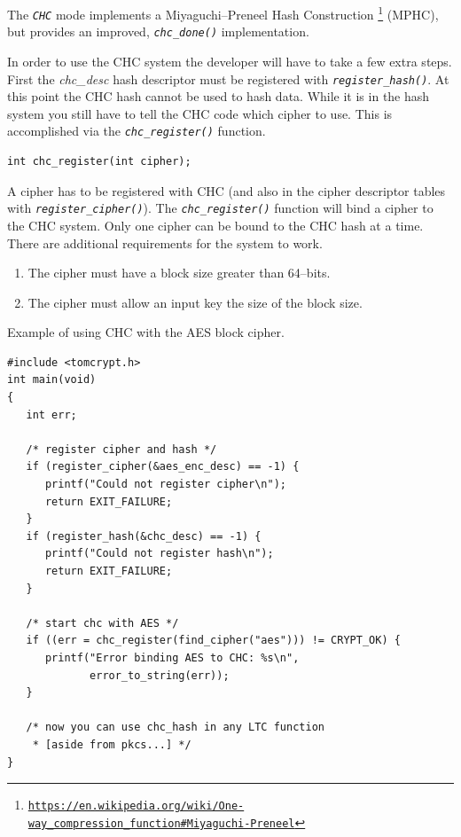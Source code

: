 \documentclass[synpaper]{book}
\newcommand{\code}[1]{\texttt{\textit{#1}}}
\begin{document}
The \code{CHC} mode implements a Miyaguchi–Preneel Hash Construction
\footnote{\href{https://en.wikipedia.org/wiki/One-way_compression_function\#Miyaguchi–Preneel}{\nolinkurl{https://en.wikipedia.org/wiki/One-way_compression_function\#Miyaguchi-Preneel}}}
(MPHC), but provides an improved, \code{chc\_done()} implementation.


In order to use the CHC system the developer will have to take a few extra steps.  First the \textit{chc\_desc} hash
descriptor must be registered with \code{register\_hash()}.  At this point the CHC hash cannot be used to hash
data.  While it is in the hash system you still have to tell the CHC code which cipher to use.  This is accomplished
via the \code{chc\_register()} function.

\begin{verbatim}
int chc_register(int cipher);
\end{verbatim}

A cipher has to be registered with CHC (and also in the cipher descriptor tables with
\code{register\_cipher()}).  The \code{chc\_register()} function will bind a cipher to the CHC system.  Only one cipher can
be bound to the CHC hash at a time.  There are additional requirements for the system to work.

\begin{enumerate}
   \item The cipher must have a block size greater than 64--bits.
   \item The cipher must allow an input key the size of the block size.
\end{enumerate}

Example of using CHC with the AES block cipher.

\begin{verbatim}
#include <tomcrypt.h>
int main(void)
{
   int err;

   /* register cipher and hash */
   if (register_cipher(&aes_enc_desc) == -1) {
      printf("Could not register cipher\n");
      return EXIT_FAILURE;
   }
   if (register_hash(&chc_desc) == -1) {
      printf("Could not register hash\n");
      return EXIT_FAILURE;
   }

   /* start chc with AES */
   if ((err = chc_register(find_cipher("aes"))) != CRYPT_OK) {
      printf("Error binding AES to CHC: %s\n",
             error_to_string(err));
   }

   /* now you can use chc_hash in any LTC function
    * [aside from pkcs...] */
}
\end{verbatim}
\end{document}
